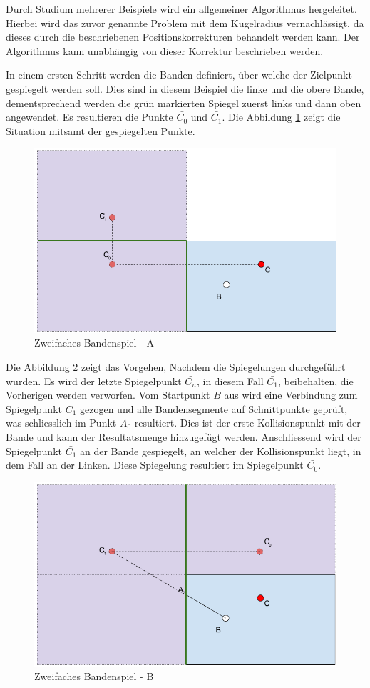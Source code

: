 Durch Studium mehrerer Beispiele wird ein allgemeiner Algorithmus hergeleitet. Hierbei wird das zuvor genannte Problem
mit dem Kugelradius vernachlässigt, da dieses durch die beschriebenen Positionskorrekturen behandelt werden kann.
Der Algorithmus kann unabhängig von dieser Korrektur beschrieben werden.

In einem ersten Schritt werden die Banden definiert, über welche der Zielpunkt gespiegelt werden soll. Dies sind in
diesem Beispiel die linke und die obere Bande, dementsprechend werden die grün markierten Spiegel zuerst links und
dann oben angewendet. Es resultieren die Punkte $\bar{C_0}$ und $\bar{C_1}$. Die Abbildung \ref{fig:zweifaches_bandenspiel_a} zeigt die
Situation mitsamt der gespiegelten Punkte.
\begin{figure}[h!]
    \begin{center}
        \includegraphics[width=0.5\linewidth]{../common/03_billiard_ai/resources/50_rail_reflection_2_a.png}
    \end{center}
    \caption{Zweifaches Bandenspiel - A}
    \label{fig:zweifaches_bandenspiel_a}
\end{figure}

Die Abbildung \ref{fig:zweifaches_bandenspiel_b} zeigt das Vorgehen, Nachdem die Spiegelungen durchgeführt wurden.
Es wird der letzte Spiegelpunkt $\bar{C_n}$, in diesem Fall $\bar{C_1}$,
beibehalten, die Vorherigen werden verworfen. Vom Startpunkt $B$ aus wird eine Verbindung zum Spiegelpunkt $\bar{C_1}$
gezogen und alle Bandensegmente auf Schnittpunkte geprüft, was schliesslich im Punkt $A_0$ resultiert. Dies ist
der erste Kollisionspunkt mit der Bande und kann der Resultatsmenge hinzugefügt werden. Anschliessend wird der Spiegelpunkt
$\bar{C_1}$ an der Bande gespiegelt, an welcher der Kollisionspunkt liegt, in dem Fall an der Linken. Diese Spiegelung
resultiert im Spiegelpunkt $\bar{C_0}$.
\begin{figure}[h!]
    \begin{center}
        \includegraphics[width=0.5\linewidth]{../common/03_billiard_ai/resources/51_rail_reflection_2_b.png}
    \end{center}
    \caption{Zweifaches Bandenspiel - B}
    \label{fig:zweifaches_bandenspiel_b}
\end{figure}


